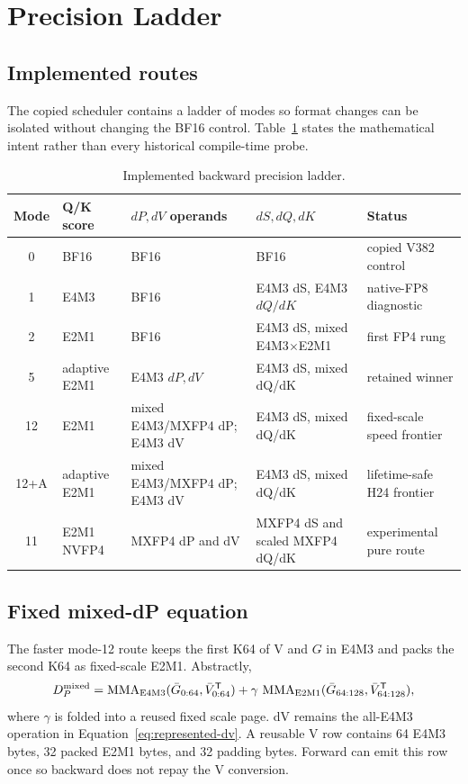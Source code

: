 \section{Precision Ladder}
\label{app:precision-ladder}

\subsection{Implemented routes}

The copied scheduler contains a ladder of modes so format changes can be
isolated without changing the BF16 control.  Table~\ref{tab:precision-ladder}
states the mathematical intent rather than every historical compile-time
probe.

\begin{table}[htbp]
\centering
\caption{Implemented backward precision ladder.}
\label{tab:precision-ladder}
\scriptsize
\begin{tabularx}{\textwidth}{c l l l X}
\toprule
Mode & Q/K score & $dP,dV$ operands & $dS,dQ,dK$ & Status \\
\midrule
0 & BF16 & BF16 & BF16 & copied V382 control \\
1 & E4M3 & BF16 & E4M3 dS, E4M3 $dQ/dK$ & native-FP8 diagnostic \\
2 & E2M1 & BF16 & E4M3 dS, mixed E4M3$\times$E2M1 & first FP4 rung \\
5 & adaptive E2M1 & E4M3 $dP,dV$ & E4M3 dS, mixed dQ/dK & retained winner \\
12 & E2M1 & mixed E4M3/MXFP4 dP; E4M3 dV &
E4M3 dS, mixed dQ/dK & fixed-scale speed frontier \\
12+A & adaptive E2M1 & mixed E4M3/MXFP4 dP; E4M3 dV &
E4M3 dS, mixed dQ/dK & lifetime-safe H24 frontier \\
11 & E2M1 NVFP4 & MXFP4 dP and dV &
MXFP4 dS and scaled MXFP4 dQ/dK & experimental pure route \\
\bottomrule
\end{tabularx}
\end{table}

\subsection{Fixed mixed-dP equation}

The faster mode-12 route keeps the first K64 of V and $G$ in E4M3 and packs
the second K64 as fixed-scale E2M1.  Abstractly,
\begin{equation}
  D_P^{\mathrm{mixed}}
  =
  \operatorname{MMA}_{\mathrm{E4M3}}(\bar G_{0:64},\bar V_{0:64}^{\mathsf T})
  +\gamma\,
  \operatorname{MMA}_{\mathrm{E2M1}}(\bar G_{64:128},\bar V_{64:128}^{\mathsf T}),
  \label{eq:mixed-dp}
\end{equation}
where $\gamma$ is folded into a reused fixed scale page.  dV remains the
all-E4M3 operation in Equation~\ref{eq:represented-dv}.  A reusable V row
contains 64 E4M3 bytes, 32 packed E2M1 bytes, and 32 padding bytes.  Forward
can emit this row once so backward does not repay the V conversion.

